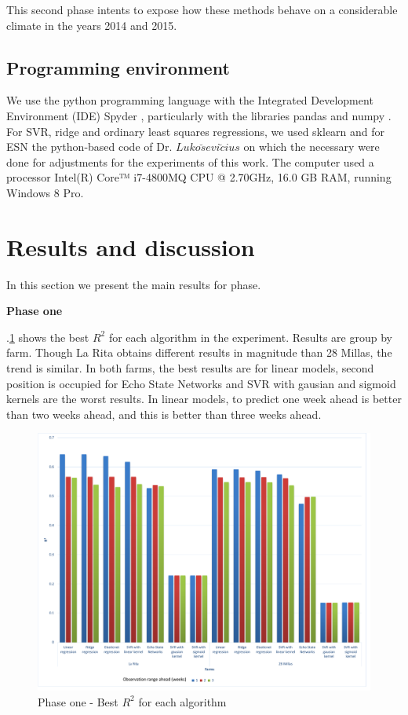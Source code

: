 \documentclass[review]{elsarticle}
\begin{document}
This second phase intents to expose how these methods behave on a considerable climate in the years 2014 and 2015.

\subsection{Programming environment}

We use the python programming language with the Integrated Development Environment (IDE) Spyder \citep{Continuum2015}, particularly with the libraries pandas \citep{mckinneypandas2010} and numpy \citep{vanderWalt2011}. For SVR, ridge and ordinary least squares regressions, we used sklearn \citep{scikitlearn2011} and for ESN the python-based code of Dr. $Luko\breve{s} evi \breve{c} ius$ \citep{Lukose2012} on which the necessary were done for adjustments for the experiments of this work. The computer used a processor Intel(R) Core™ i7-4800MQ CPU @ 2.70GHz, 16.0 GB RAM, running Windows 8 Pro.

\section{Results and discussion}

In this section we present the main results for phase.

{\bf Phase one } 

\figurename $.$\ref{figura4} shows the best $R^2$ for each algorithm in the experiment. Results are group by farm. Though La Rita obtains different results in magnitude than 28 Millas, the trend is similar. In both farms, the best results are for linear models, second position is occupied for Echo State Networks and  SVR with gausian and sigmoid kernels are the worst results. In linear models, to predict one week ahead is better than two weeks ahead, and this is better than three weeks ahead. 

\begin{figure}[H] 
 \centering
 \includegraphics[scale=.5]{Phase_one_Best_R2_for_each_algortihm}
 \caption{Phase one - Best $R^2$ for each algorithm} 
 \label{figura4} 
\end{figure}
\end{document}
